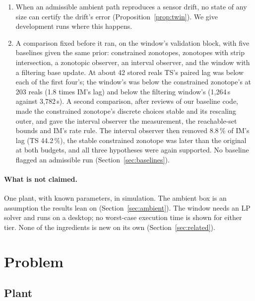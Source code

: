 \documentclass[11pt,a4paper]{article}
\begin{document}
\begin{enumerate}
\item When an admissible ambient path reproduces a sensor drift, no state of any size can certify the drift's error
  (Proposition~\ref{prop:twin}). We give development runs where this happens.
\item A comparison fixed before it ran, on the window's validation block, with five baselines given the same prior:
  constrained zonotopes, zonotopes with strip intersection, a zonotopic observer, an interval observer, and the
  window with a filtering base update. At about 42 stored reals TS's paired lag was below each of the first four's;
  the window's was below the constrained zonotope's at 203 reals (1.8 times IM's lag) and below the filtering
  window's (1,264\,s against 3,782\,s). A second comparison, after reviews of our baseline code, made the constrained
  zonotope's discrete choices stable and its rescaling outer, and gave the interval observer the measurement, the
  reachable-set bounds and IM's rate rule. The interval observer then removed 8.8\,\% of IM's lag (TS 44.2\,\%), the
  stable constrained zonotope was later than the original at both budgets, and all three hypotheses were again
  supported. No baseline flagged an admissible run (Section~\ref{sec:baselines}).
\end{enumerate}

\paragraph{What is not claimed.} One plant, with known parameters, in simulation. The ambient box is an assumption the
results lean on (Section~\ref{sec:ambient}). The window needs an LP solver and runs on a desktop; no worst-case
execution time is shown for either tier. None of the ingredients is new on its own (Section~\ref{sec:related}).

\section{Problem}

\subsection{Plant}\label{sec:plant}
\end{document}
